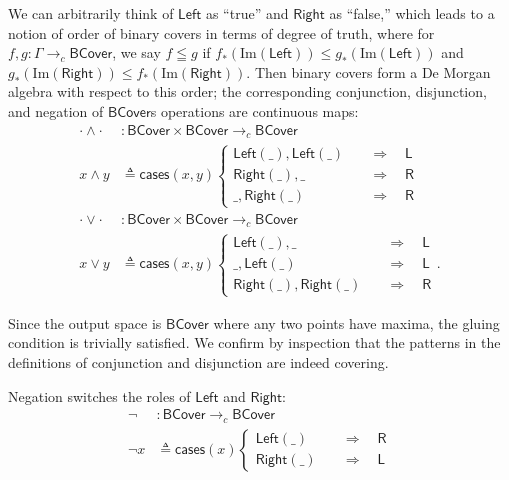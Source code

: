 \documentclass[conference]{IEEEtran}
\newcommand{\cto}{\to_c}
\newcommand{\wildcard}{\_}
\newcommand{\Img}[1]{\text{Im}\left({#1}\right)}
\newcommand{\Branch}{\Rightarrow}
\begin{document}
We can arbitrarily think of $\mathsf{Left}$ as ``true'' and $\mathsf{Right}$ as ``false,'' which leads to a notion of order of binary covers in terms of degree of truth, where for $f, g : \Gamma \cto \mathsf{BCover}$, we say $f \leqq g$ if $f_*(\Img{\mathsf{Left}}) \le g_*(\Img{\mathsf{Left}})$ and $g_*(\Img{\mathsf{Right}}) \le f_*(\Img{\mathsf{Right}})$. Then binary covers form a De Morgan algebra with respect to this order; the corresponding conjunction, disjunction, and negation of $\mathsf{BCover}$s operations are continuous maps:
\begin{align*}
\cdot \wedge \cdot &: \mathsf{BCover} \times \mathsf{BCover} \cto \mathsf{BCover}
\\ x \wedge y &\triangleq \mathsf{cases}(x, y)
\begin{cases}
\mathsf{Left}(\wildcard), \mathsf{Left}(\wildcard)
 \quad &\Branch \quad
 \mathsf{L}
\\
\mathsf{Right}(\wildcard), \wildcard
 \quad &\Branch \quad
 \mathsf{R}
\\
\wildcard, \mathsf{Right}(\wildcard)
 \quad &\Branch \quad
 \mathsf{R}
\end{cases}
\\
\cdot \vee \cdot &: \mathsf{BCover} \times \mathsf{BCover} \cto \mathsf{BCover}
\\ x \vee y &\triangleq \mathsf{cases}(x, y)
\begin{cases}
\mathsf{Left}(\wildcard), \wildcard
 \quad &\Branch \quad
 \mathsf{L}
\\
\wildcard, \mathsf{Left}(\wildcard)
 \quad &\Branch \quad
 \mathsf{L}
\\
 \mathsf{Right}(\wildcard), \mathsf{Right}(\wildcard)
 \quad &\Branch \quad
 \mathsf{R}
\end{cases}.
\end{align*}

Since the output space is $\mathsf{BCover}$ where any two points have maxima, the gluing condition is trivially satisfied. We confirm by inspection that the patterns in the definitions of conjunction and disjunction are indeed covering.

Negation switches the roles of $\mathsf{Left}$ and $\mathsf{Right}$:
\begin{align*}
 \neg &: \mathsf{BCover} \cto \mathsf{BCover}
\\ \neg x &\triangleq \mathsf{cases}(x)
\begin{cases}
\mathsf{Left}(\wildcard)
 \quad &\Branch \quad
 \mathsf{R}
\\
\mathsf{Right}(\wildcard)
 \quad &\Branch \quad
 \mathsf{L}
\end{cases}
\end{align*}
\end{document}
